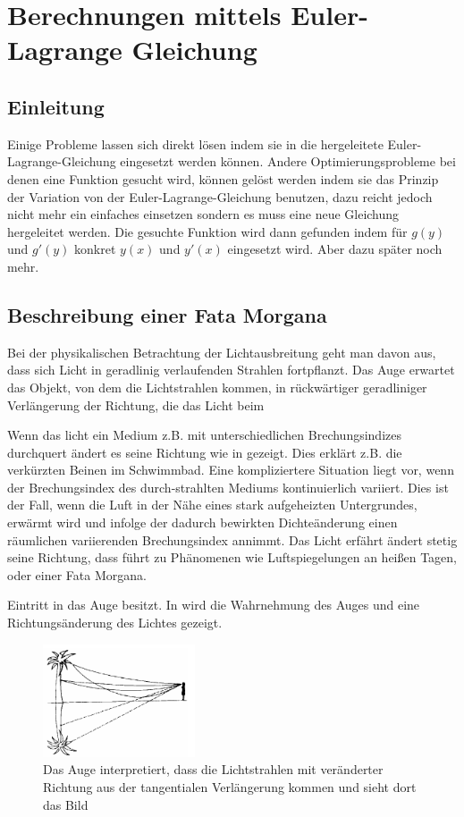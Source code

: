 \section{Berechnungen mittels Euler-Lagrange Gleichung}
\subsection{Einleitung}
Einige Probleme lassen sich direkt lösen indem sie in die hergeleitete Euler-Lagrange-Gleichung eingesetzt werden können. Andere Optimierungsprobleme bei denen eine Funktion gesucht wird, können gelöst werden indem sie das Prinzip der Variation von der Euler-Lagrange-Gleichung benutzen, dazu reicht jedoch nicht mehr ein einfaches einsetzen sondern es muss eine neue Gleichung hergeleitet werden. Die gesuchte Funktion wird dann gefunden indem für $g(y)$ und $g'(y)$ konkret $y(x)$ und $y'(x)$ eingesetzt wird. Aber dazu später noch mehr.

\subsection{Beschreibung einer Fata Morgana}
\cite{fataEinleitung}
Bei der physikalischen Betrachtung der Lichtausbreitung geht man davon aus, dass sich Licht in
geradlinig verlaufenden Strahlen fortpflanzt. Das Auge erwartet das Objekt, von dem die Lichtstrahlen
kommen, in rückwärtiger geradliniger Verlängerung der Richtung, die das Licht beim

Wenn das licht ein Medium z.B. mit unterschiedlichen Brechungsindizes durchquert ändert es seine Richtung wie in  gezeigt. Dies erklärt z.B. die verkürzten Beinen im Schwimmbad.
Eine kompliziertere Situation liegt vor, wenn der Brechungsindex des durch-strahlten Mediums kontinuierlich variiert. 
Dies ist der Fall, wenn die Luft in der Nähe eines stark aufgeheizten Untergrundes, erwärmt
wird und infolge der dadurch bewirkten Dichteänderung einen räumlichen variierenden Brechungsindex annimmt. 
Das Licht erfährt ändert stetig seine Richtung, dass führt zu Phänomenen wie Luftspiegelungen an heißen Tagen, oder einer Fata Morgana. 

Eintritt in das Auge besitzt. In  wird die Wahrnehmung des Auges und eine Richtungsänderung des Lichtes gezeigt.

\begin{figure}[H]
	\includegraphics[width=0.4\textwidth]{./picture/FataEinleitung.png}
	\caption{Das Auge interpretiert, dass die Lichtstrahlen mit veränderter Richtung aus der tangentialen Verlängerung kommen und sieht dort das Bild}
	\label{Ab:fataEinleitung}
\end{figure}


